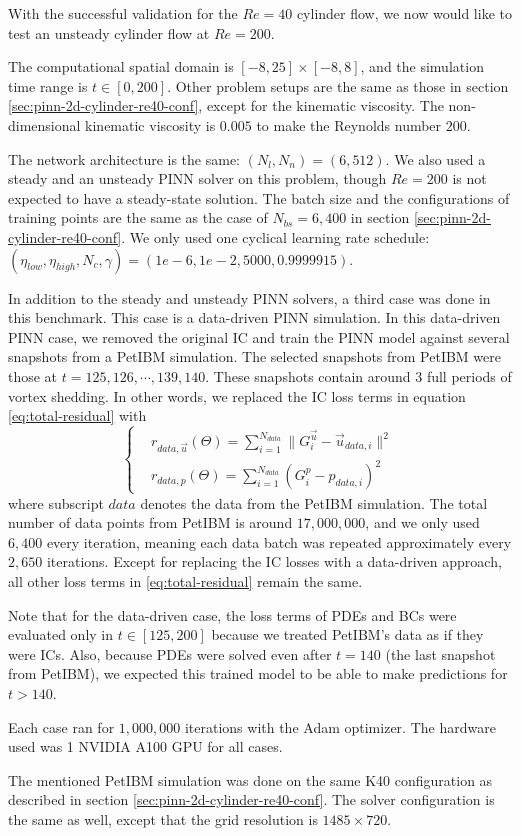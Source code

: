 With the successful validation for the $Re=40$ cylinder flow, we now would like to test an unsteady cylinder flow at $Re=200$.

The computational spatial domain is $[-8, 25]\times[-8, 8]$, and the simulation time range is $t\in[0, 200]$.
Other problem setups are the same as those in section \ref{sec:pinn-2d-cylinder-re40-conf}, except for the kinematic viscosity.
The non-dimensional kinematic viscosity is $0.005$ to make the Reynolds number $200$.

The network architecture is the same: $(N_l, N_n)=(6, 512)$.
We also used a steady and an unsteady PINN solver on this problem, though $Re=200$ is not expected to have a steady-state solution.
The batch size and the configurations of training points are the same as the case of $N_{bs}=6,400$ in section \ref{sec:pinn-2d-cylinder-re40-conf}.
We only used one cyclical learning rate schedule: $(\eta_{low}, \eta_{high}, N_c, \gamma)=(1e-6, 1e-2, 5000, 0.9999915)$.

In addition to the steady and unsteady PINN solvers, a third case was done in this benchmark.
This case is a data-driven PINN simulation.
In this data-driven PINN case, we removed the original IC and train the PINN model against several snapshots from a PetIBM simulation.
The selected snapshots from PetIBM were those at $t=125,126,\cdots,139, 140$.
These snapshots contain around $3$ full periods of vortex shedding.
In other words, we replaced the IC loss terms in equation \eqref{eq:total-residual} with  
\begin{equation}\label{eq:data-driven-loss}
    \left\{
        \begin{aligned}
            &r_{data,\vec{u}}(\Theta) = \sum\limits_{i=1}^{N_{data}}\lVert G_i^{\vec{u}} - \vec{u}_{data, i}\rVert^2 \\
            &r_{data,p}(\Theta) = \sum\limits_{i=1}^{N_{data}}\left( G_i^{p} - p_{data, i} \right)^2
        \end{aligned}
    \right.
\end{equation}
where subscript $data$ denotes the data from the PetIBM simulation.
The total number of data points from PetIBM is around $17,000,000$, and we only used $6,400$ every iteration, meaning each data batch was repeated approximately every $2,650$ iterations.
Except for replacing the IC losses with a data-driven approach, all other loss terms in \eqref{eq:total-residual} remain the same.

Note that for the data-driven case, the loss terms of PDEs and BCs were evaluated only in $t\in[125, 200]$ because we treated PetIBM's data as if they were ICs.
Also, because PDEs were solved even after $t=140$ (the last snapshot from PetIBM), we expected this trained model to be able to make predictions for $t>140$.

Each case ran for $1,000,000$ iterations with the Adam optimizer.
The hardware used was 1 NVIDIA A100 GPU for all cases.

The mentioned PetIBM simulation was done on the same K40 configuration as described in section \ref{sec:pinn-2d-cylinder-re40-conf}.
The solver configuration is the same as well, except that the grid resolution is $1485\times 720$.
